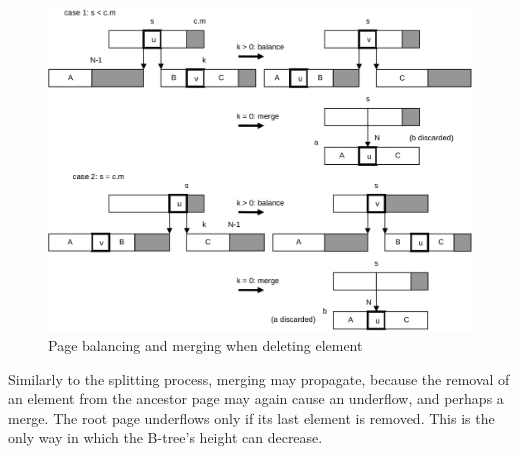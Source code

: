 \begin{figure}
	\label{fig:page-merge}
	\centering
	\includegraphics[width=.95\textwidth]{i/p}
	\caption{Page balancing and merging when deleting element}
\end{figure}
Similarly to the splitting process, merging may propagate, because the removal of an element
from the ancestor page may again cause an underflow, and perhaps a merge. The root page
underflows only if its last element is removed. This is the only way in which the B-tree's height
can decrease.
